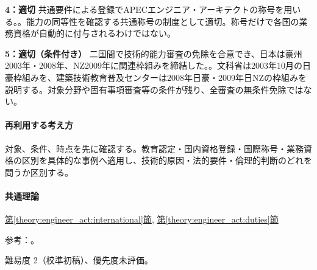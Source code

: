 \noindent\textbf{4：適切} 共通要件による登録でAPECエンジニア・アーキテクトの称号を用いる。。能力の同等性を確認する共通称号の制度として適切。称号だけで各国の業務資格が自動的に付与されるわけではない。\par

\noindent\textbf{5：適切（条件付き）} 二国間で技術的能力審査の免除を合意でき、日本は豪州2003年・2008年、NZ2009年に関連枠組みを締結した。。文科省は2003年10月の日豪枠組みを、建築技術教育普及センターは2008年日豪・2009年日NZの枠組みを説明する。対象分野や固有事項審査等の条件が残り、全審査の無条件免除ではない。\par

\paragraph{再利用する考え方} 対象、条件、時点を先に確認する。教育認定・国内資格登録・国際称号・業務資格の区別を具体的な事例へ適用し、技術的原因・法的要件・倫理的判断のどれを問うか区別する。

\paragraph{共通理論} \hyperref[theory:engineer_act:international]{第\ref*{theory:engineer_act:international}節}, \hyperref[theory:engineer_act:duties]{第\ref*{theory:engineer_act:duties}節}

\par 参考：\cite{engineer_act_current,ipej_associate_registration,jabee_canberra,ipej_ipea2014,mext_international,jaeic_mutual2010}。

\par 難易度 2（校準初稿）、優先度未評価。
